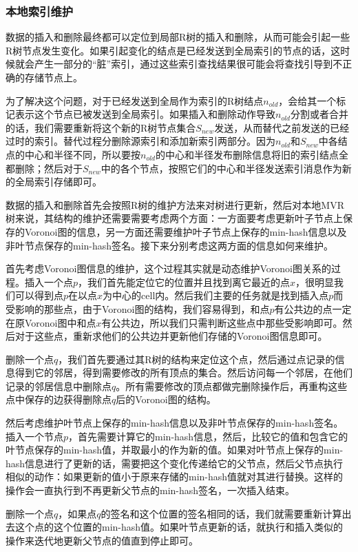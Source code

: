 \documentclass{ML}
\begin{document}
\subsubsection{本地索引维护}
数据的插入和删除最终都可以定位到局部R树的插入和删除，从而可能会引起一些R树节点发生变化。如果引起变化的结点是已经发送到全局索引的节点的话，这时候就会产生一部分的“脏”索引，通过这些索引查找结果很可能会将查找引导到不正确的存储节点上。

为了解决这个问题，对于已经发送到全局作为索引的R树结点$n_{old}$，会给其一个标记表示这个节点已被发送到全局索引。如果插入和删除动作导致$n_{old}$分割或者合并的话，我们需要重新将这个新的R树节点集合$S_{new}$发送，从而替代之前发送的已经
过时的索引。替代过程分删除源索引和添加新索引两部分。因为$n_{old}$和$S_{new}$中各结点的中心和半径不同，所以要按$n_{old}$的中心和半径发布删除信息将旧的索引结点全都删除；然后对于$S_{new}$中的各个节点，按照它们的中心和半径发送索引消息作为新的全局索引存储即可。

数据的插入和删除首先会按照R树的维护方法来对树进行更新，然后对本地MVR树来说，其结构的维护还需要需要考虑两个方面：一方面要考虑更新叶子节点上保存的Voronoi图的信息，另一方面还需要维护叶子节点上保存的min-hash信息以及非叶节点保存的min-hash签名。接下来分别考虑这两方面的信息如何来维护。

首先考虑Voronoi图信息的维护，这个过程其实就是动态维护Voronoi图关系的过程\cite{maintain-index}。插入一个点$p$，我们首先能定位它的位置并且找到离它最近的点$x$，很明显我们可以得到点$p$在以点$x$为中心的cell内。然后我们主要的任务就是找到插入点$p$而受影响的那些点，由于Voronoi图的结构，我们容易得到，和点$p$有公共边的点一定在原Voronoi图中和点$x$有公共边，所以我们只需判断这些点中那些受影响即可。然后对于这些点，重新求他们的公共边并更新他们存储的Voronoi图信息即可。

删除一个点$q$，我们首先要通过其R树的结构来定位这个点，然后通过点记录的信息得到它的邻居，得到需要修改的所有顶点的集合。然后访问每一个邻居，在他们记录的邻居信息中删除点$q$。所有需要修改的顶点都做完删除操作后，再重构这些点中保存的边获得删除点$q$后的Voronoi图的结构。

然后考虑维护叶节点上保存的min-hash信息以及非叶节点保存的min-hash签名。插入一个节点$p$，首先需要计算它的min-hash信息，然后，比较它的值和包含它的叶节点保存的min-hash值，并取最小的作为新的值。如果对叶节点上保存的min-hash信息进行了更新的话，需要把这个变化传递给它的父节点，然后父节点执行相似的动作：如果更新的值小于原来存储的min-hash值就对其进行替换。这样的操作会一直执行到不再更新父节点的min-hash签名，一次插入结束。

删除一个点$q$，如果点$q$的签名和这个位置的签名相同的话，我们就需要重新计算出去这个点的这个位置的min-hash值。如果叶节点更新的话，就执行和插入类似的操作来迭代地更新父节点的值直到停止即可。
\end{document}
